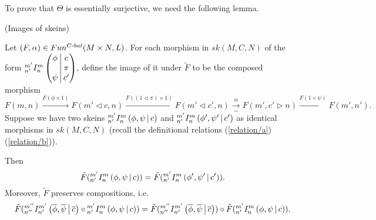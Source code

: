 \noindent To prove that $\Theta$ is essentially surjective, we need the following
lemma.

\begin{lemma} (Images of skeins) \label{lemma/image-of-skein}

  \noindent
  Let $(F,\alpha) \in Fun^{C{\text -}bal}(M \times N, L)$. For each morphism
  in $sk(M,C,N)$ of the form ${}^{m'}_{n'} I^{m}_{n} \left( \begin{matrix} \phi \\ {}\\ \psi \end{matrix} \,\middle|\, \begin{matrix} c \\ \pi \\ c' \end{matrix} \right)$,
  define the image of it under $\tilde{F}$ to be the composed morphism
  \[
    F(m,n)
    \xrightarrow{F(\phi \times 1)}
    F(m' \lhd c, n)
    \xrightarrow{F((1 \lhd \pi) \times 1)}
    F(m' \lhd c', n)
    \xrightarrow[\sim]{\alpha}
    F(m', c' \rhd n)
    \xrightarrow{F(1 \times \psi)}
    F(m',n').
  \]
  Suppose we have two skeins ${}^{m'}_{n'} I^{m}_{n} \left( \phi, \psi \,\middle|\, c \right)$ and
  $ {}^{m'}_{n'} I^{m}_{n} \left( \phi', \psi' \,\middle|\, c' \right)$ as identical morphisms in $sk(M,C,N)$
  (recall the definitional relations (\ref{relation/a}) (\ref{relation/b})).

  \noindent Then
  \begin{equation} \label{eqn/a}
    \tilde{F}({}^{m'}_{n'} I^{m}_{n} \left( \phi, \psi \,\middle|\, c \right)) = \tilde{F}({}^{m'}_{n'} I^{m}_{n} \left( \phi', \psi' \,\middle|\, c' \right)).
  \end{equation}
  Moreover, $\tilde{F}$ preserves compositions, i.e.
  \begin{equation} \label{eqn/b}
    \tilde{F}({}^{m''}_{n''} I^{m'}_{n'} \left( \overline{\phi}, \overline{\psi} \,\middle|\, \overline{c} \right) \circ {}^{m'}_{n'} I^{m}_{n} \left( \phi, \psi \,\middle|\, c \right))
    = \tilde{F}({}^{m''}_{n''} I^{m'}_{n'} \left( \overline{\phi}, \overline{\psi} \,\middle|\, \overline{c} \right))
    \circ
    \tilde{F}({}^{m'}_{n'} I^{m}_{n} \left( \phi, \psi \,\middle|\, c \right)).
  \end{equation}
\end{lemma}

